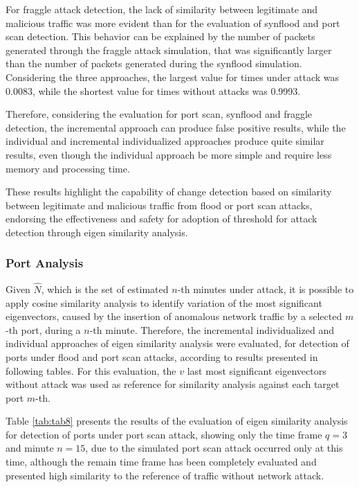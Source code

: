 For fraggle attack detection, the lack of similarity between legitimate and malicious traffic was more evident than for the evaluation of synflood and port scan detection. This behavior can be explained by the number of packets generated through the fraggle attack simulation, that was significantly larger than the number of packets generated during the synflood simulation. Considering the three approaches, the largest value for times under attack was 0.0083, while the shortest value for times without attacks was 0.9993. 

Therefore, considering the evaluation for port scan, synflood and fraggle detection, the incremental approach can produce false positive results, while the individual and incremental individualized approaches produce quite similar results, even though the individual approach be more simple and require less memory and processing time.

These results highlight the capability of change detection based on similarity between legitimate and malicious traffic from flood or port scan attacks, endorsing the effectiveness and safety for adoption of threshold for attack detection through eigen similarity analysis.

\subsubsection{Port Analysis}
\label{sec:2_PortAnalysis}

Given $\hat{N}$, which is the set of estimated $n$-th minutes under attack, it is possible to apply cosine similarity analysis to identify variation of the most significant eigenvectors, caused by the insertion of anomalous network traffic by a selected $m$-th port, during a $n$-th minute. Therefore, the incremental individualized and individual approaches of eigen similarity analysis were evaluated, for detection of ports under flood and port scan attacks, according to results presented in following tables. For this evaluation, the $v$ last most significant eigenvectors without attack was used as reference for similarity analysis against each target port $m$-th.

Table \ref{tab:tab8} presents the results of the evaluation of eigen similarity analysis for detection of ports under port scan attack, showing only the time frame $q=3$ and minute $n=15$, due to the simulated port scan attack occurred only at this time, although the remain time frame has been completely evaluated and presented high similarity to the reference of traffic without network attack.


